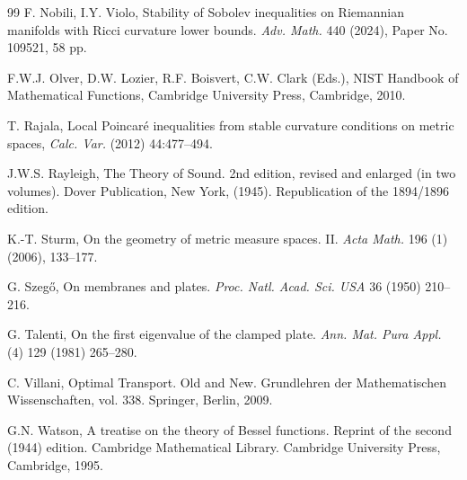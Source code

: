 \documentclass[11pt, reqno]{amsart}
\numberwithin{equation}{section}
\begin{document}
\begin{thebibliography}{99}
		  F. Nobili, I.Y. Violo, Stability of Sobolev inequalities on Riemannian manifolds with Ricci curvature lower bounds. \textit{Adv. Math.} 440 (2024), Paper No. 109521, 58 pp. 
		
		
		
		 F.W.J. Olver, D.W. Lozier, R.F. Boisvert, C.W. Clark (Eds.), NIST Handbook of Mathematical Functions, Cambridge University Press, Cambridge, 2010. 
		
		 T. Rajala, Local Poincar\'e inequalities from stable curvature conditions on metric spaces,  \textit{Calc. Var.} (2012) 44:477--494.
		
		 J.W.S. Rayleigh, The Theory of Sound. 2nd edition, revised and enlarged
		(in two volumes). Dover Publication, New York, (1945). Republication of the
		1894/1896 edition.
				
		
		 K.-T. Sturm, On the geometry of metric measure spaces. II. \textit{Acta
			Math.} 196 (1) (2006), 133--177.
		
		
		 G. Szeg\H o, On membranes and plates. \textit{Proc. Natl. Acad. Sci. USA} 36 (1950) 210--216. 
		
		
		G. Talenti, On the first eigenvalue of the clamped plate. \textit{Ann. Mat. Pura Appl.} (4) 129 (1981) 265--280. 
		
	 C. 	Villani,  Optimal Transport. Old and New. Grundlehren der Mathematischen Wissenschaften, vol.
		338. Springer, Berlin, 2009. 
		
		 G.N. Watson,  A treatise on the theory of Bessel functions. Reprint of the second (1944) edition. Cambridge Mathematical Library. Cambridge University Press, Cambridge, 1995.
	\end{thebibliography}
	
	
\end{document}
